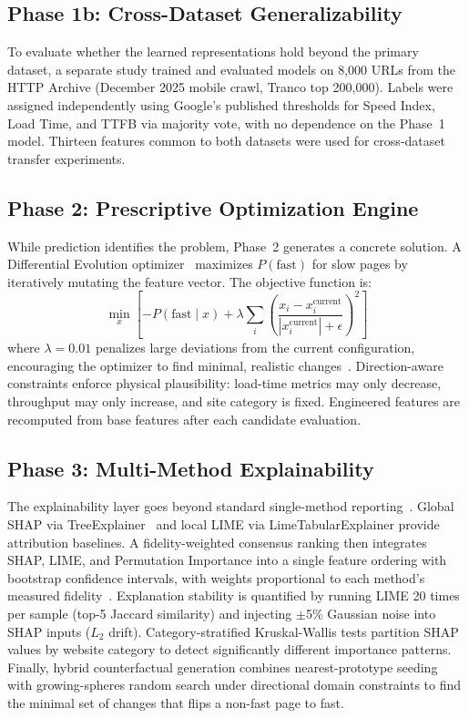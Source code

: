 \documentclass{svproc}
\begin{document}
\subsection{Phase 1b: Cross-Dataset Generalizability}

To evaluate whether the learned representations hold beyond the primary dataset, a separate study trained and evaluated models on 8,000 URLs from the HTTP Archive (December 2025 mobile crawl, Tranco top 200,000). Labels were assigned independently using Google's published thresholds for Speed Index, Load Time, and TTFB via majority vote, with no dependence on the Phase~1 model. Thirteen features common to both datasets were used for cross-dataset transfer experiments.

\subsection{Phase 2: Prescriptive Optimization Engine}

While prediction identifies the problem, Phase~2 generates a concrete solution. A Differential Evolution optimizer~\cite{asha2025} maximizes $P(\text{fast})$ for slow pages by iteratively mutating the feature vector. The objective function is:
\[
\min_{x}\left[-P(\text{fast} \mid x) + \lambda \sum_i \left(\frac{x_i - x_i^{\text{current}}}{|x_i^{\text{current}}| + \epsilon}\right)^{\!2}\right]
\]
where $\lambda = 0.01$ penalizes large deviations from the current configuration, encouraging the optimizer to find minimal, realistic changes~\cite{notz2024,surianarayanan2023}. Direction-aware constraints enforce physical plausibility: load-time metrics may only decrease, throughput may only increase, and site category is fixed. Engineered features are recomputed from base features after each candidate evaluation.

\subsection{Phase 3: Multi-Method Explainability}

The explainability layer goes beyond standard single-method reporting~\cite{hassija2024,bennetot2024}. Global SHAP via TreeExplainer~\cite{salih2024} and local LIME via LimeTabularExplainer provide attribution baselines. A fidelity-weighted consensus ranking then integrates SHAP, LIME, and Permutation Importance into a single feature ordering with bootstrap confidence intervals, with weights proportional to each method's measured fidelity~\cite{goldwasser2024}. Explanation stability is quantified by running LIME 20 times per sample (top-5 Jaccard similarity) and injecting $\pm$5\% Gaussian noise into SHAP inputs ($L_2$ drift). Category-stratified Kruskal-Wallis tests partition SHAP values by website category to detect significantly different importance patterns. Finally, hybrid counterfactual generation combines nearest-prototype seeding with growing-spheres random search under directional domain constraints to find the minimal set of changes that flips a non-fast page to fast.
\end{document}
